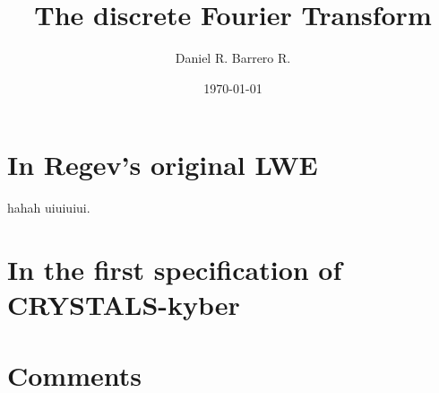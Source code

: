 \documentclass{amsart}
\title{The discrete Fourier Transform}
\author{Daniel R. Barrero R.}
\date{\today}
\begin{document}
\maketitle

\section{In Regev's original LWE}

hahah \cite{regev-LWE-2009} uiuiuiui.

\section{In the first specification of CRYSTALS-kyber}

\section{Comments}



\end{document}
